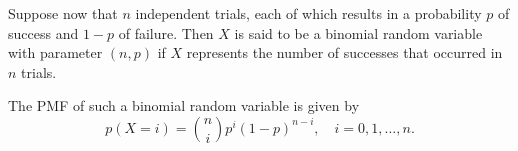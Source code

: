 \documentclass{article}
\begin{document}
Suppose now that \( n \) independent trials, each of which results in a probability \( p \) of success and \( 1 - p \) of failure. Then \( X \) is said to be a binomial random variable with parameter \( (n, p) \) if \( X \) represents the number of successes that occurred in \( n \) trials.

The PMF of such a binomial random variable is given by
\[
p(X = i) = \binom{n}{i} p^i (1 - p)^{n - i}, \quad i = 0, 1, \ldots, n.
\]
\end{document}
